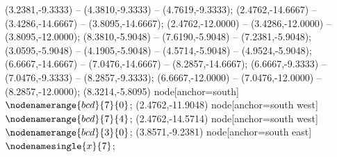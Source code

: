    (3.2381,-9.3333) -- (4.3810,-9.3333) -- (4.7619,-9.3333);
   (2.4762,-14.6667) -- (3.4286,-14.6667) -- (3.8095,-14.6667);
   (2.4762,-12.0000) -- (3.4286,-12.0000) -- (3.8095,-12.0000);
   (8.3810,-5.9048) -- (7.6190,-5.9048) -- (7.2381,-5.9048);
   (3.0595,-5.9048) -- (4.1905,-5.9048) -- (4.5714,-5.9048) -- (4.9524,-5.9048);
   (6.6667,-14.6667) -- (7.0476,-14.6667) -- (8.2857,-14.6667);
   (6.6667,-9.3333) -- (7.0476,-9.3333) -- (8.2857,-9.3333);
   (6.6667,-12.0000) -- (7.0476,-12.0000) -- (8.2857,-12.0000);
   (8.3214,-5.8095) node[anchor=south] {$\nodenamerange{bcd}{7}{0}$};
   (2.4762,-11.9048) node[anchor=south west] {$\nodenamerange{bcd}{7}{4}$};
   (2.4762,-14.5714) node[anchor=south west] {$\nodenamerange{bcd}{3}{0}$};
   (3.8571,-9.2381) node[anchor=south east] {$\nodenamesingle{x}{7}$};
